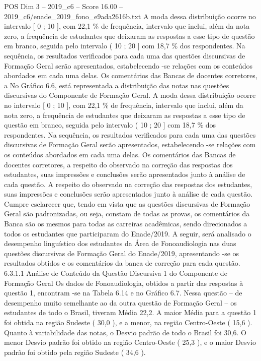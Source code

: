 \begin{textsample}{POS Dim 3 – 2019\_c6 – Score 16.00 – 2019\_c6/enade\_2019\_fono\_e9ada2616b.txt}
A moda dessa distribuição ocorre no intervalo [ 0 ; 10 ], com 22,1 \% de frequência, intervalo que inclui, além da nota zero, a frequência de estudantes que deixaram as respostas a esse tipo de questão em branco, seguida pelo intervalo ( 10 ; 20 ] com 18,7 \% dos respondentes.
Na sequência, os resultados verificados para cada uma das questões discursivas de Formação Geral serão apresentados, estabelecendo -se relações com os conteúdos abordados em cada uma delas.
Os comentários das Bancas de docentes corretores, a No Gráfico 6.6, está representada a distribuição das notas nas questões discursivas do Componente de Formação Geral.
A moda dessa distribuição ocorre no intervalo [ 0 ; 10 ], com 22,1 \% de frequência, intervalo que inclui, além da nota zero, a frequência de estudantes que deixaram as respostas a esse tipo de questão em branco, seguida pelo intervalo ( 10 ; 20 ] com 18,7 \% dos respondentes.
Na sequência, os resultados verificados para cada uma das questões discursivas de Formação Geral serão apresentados, estabelecendo -se relações com os conteúdos abordados em cada uma delas.
Os comentários das Bancas de docentes corretores, a respeito do observado na correção das respostas dos estudantes, suas impressões e conclusões serão apresentados junto à análise de cada questão.
A respeito do observado na correção das respostas dos estudantes, suas impressões e conclusões serão apresentados junto à análise de cada questão.
Cumpre esclarecer que, tendo em vista que as questões discursivas de Formação Geral são padronizadas, ou seja, constam de todas as provas, os comentários da Banca são os mesmos para todas as carreiras acadêmicas, sendo direcionados a todos os estudantes que participaram do Enade/2019.
A seguir, será analisado o desempenho linguístico dos estudantes da Área de Fonoaudiologia nas duas questões discursivas de Formação Geral do Enade/2019, apresentando -se os resultados obtidos e os comentários da banca de correção para cada questão. 6.3.1.1 Análise de Conteúdo da Questão Discursiva 1 do Componente de Formação Geral Os dados de Fonoaudiologia, obtidos a partir das respostas à questão 1, encontram -se na Tabela 6.14 e no Gráfico 6.7.
Nessa questão – de desempenho muito semelhante ao da outra questão de Formação Geral – os estudantes de todo o Brasil, tiveram Média 22,2.
A maior Média para a questão 1 foi obtida na região Sudeste ( 30,0 ), e a menor, na região Centro-Oeste ( 15,6 ).
Quanto à variabilidade das notas, o Desvio padrão de todo o Brasil foi 30,6.
O menor Desvio padrão foi obtido na região Centro-Oeste ( 25,3 ), e o maior Desvio padrão foi obtido pela região Sudeste ( 34,6 ).

\end{textsample}
